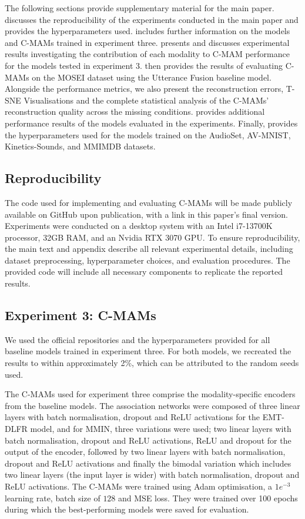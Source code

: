 The following sections provide supplementary material for the main paper.  discusses the reproducibility of the experiments conducted in the main paper and provides the hyperparameters used.  includes further information on the models and C-MAMs trained in experiment three.  presents and discusses experimental results investigating the contribution of each modality to C-MAM performance for the models tested in experiment 3.  then provides the results of evaluating C-MAMs on the MOSEI dataset using the Utterance Fusion baseline model. Alongside the performance metrics, we also present the reconstruction errors, T-SNE Visualisations and the complete statistical analysis of the C-MAMs' reconstruction quality across the missing conditions.  provides additional performance results of the models evaluated in the experiments. Finally,  provides the hyperparameters used for the models trained on the AudioSet, AV-MNIST, Kinetics-Sounds, and MMIMDB datasets.

\subsection{Reproducibility}\label{sec:reproducibility}
The code used for implementing and evaluating C-MAMs will be made publicly available on GitHub upon publication, with a link in this paper's final version. 
Experiments were conducted on a desktop system with an Intel i7-13700K processor, 32GB RAM, and an Nvidia RTX 3070 GPU.
To ensure reproducibility, the main text and appendix describe all relevant experimental details, including dataset preprocessing, hyperparameter choices, and evaluation procedures. The provided code will include all necessary components to replicate the reported results.

\subsection{Experiment 3: C-MAMs}
\label{sec:reproducibility_exp3}
We used the official repositories and the hyperparameters provided for all baseline models trained in experiment three. For both models, we recreated the results to within approximately 2\%, which can be attributed to the random seeds used. 

The C-MAMs used for experiment three comprise the modality-specific encoders from the baseline models. The association networks were composed of three linear layers with batch normalisation, dropout and ReLU activations for the EMT-DLFR model, and for MMIN, three variations were used; two linear layers with batch normalisation, dropout and ReLU activations, ReLU and dropout for the output of the encoder, followed by two linear layers with batch normalisation, dropout and ReLU activations and finally the bimodal variation which includes two linear layers (the input layer is wider) with batch normalisation, dropout and ReLU activations. The C-MAMs were trained using Adam optimisation, a $1e^{-3}$ learning rate, batch size of $128$ and MSE loss. They were trained over 100 epochs during which the best-performing models were saved for evaluation.

